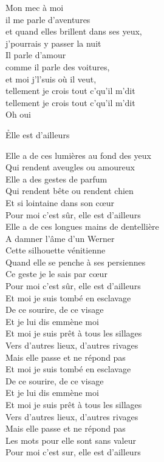 \documentclass{novel}
\begin{document}
{\begin{minipage}[t][0.44\textheight][t]{\textwidth}
\begin{multicols}{2}
Mon mec à moi \\
il me parle d'aventures \\
et quand elles brillent dans ses yeux, \\
j'pourrais y passer la nuit \\
Il parle d'amour \\
comme il parle des voitures, \\
et moi j'l'suis où il veut, \\
tellement je crois tout c'qu'il m'dit \\
tellement je crois tout c'qu'il m'dit \\
Oh oui \\
\end{multicols}
\end{minipage}
\vspace{0.07\textheight}

\begin{minipage}[b][0.6\textheight][t]{\textwidth}
\h*{Elle est d’ailleurs}
\begin{multicols}{2}
\small
Elle a de ces lumières au fond des yeux \\
Qui rendent aveugles ou amoureux \\
Elle a des gestes de parfum \\
Qui rendent bête ou rendent chien \\
Et si lointaine dans son cœur \\
Pour moi c'est sûr, elle est d'ailleurs \\

Elle a de ces longues mains de dentellière \\
A damner l'âme d'un Werner \\
Cette silhouette vénitienne \\
Quand elle se penche à ses persiennes \\
Ce geste je le sais par cœur \\
Pour moi c'est sûr, elle est d'ailleurs \\

Et moi je suis tombé en esclavage \\
De ce sourire, de ce visage \\
Et je lui dis emmène moi \\
Et moi je suis prêt à tous les sillages \\
Vers d'autres lieux, d'autres rivages \\
Mais elle passe et ne répond pas \\

Et moi je suis tombé en esclavage \\
De ce sourire, de ce visage \\
Et je lui dis emmène moi \\
Et moi je suis prêt à tous les sillages \\
Vers d'autres lieux, d'autres rivages \\
Mais elle passe et ne répond pas \\
Les mots pour elle sont sans valeur \\
Pour moi c’est sur, elle est d’ailleurs \\


\end{multicols}
\end{minipage}}
\end{document}
